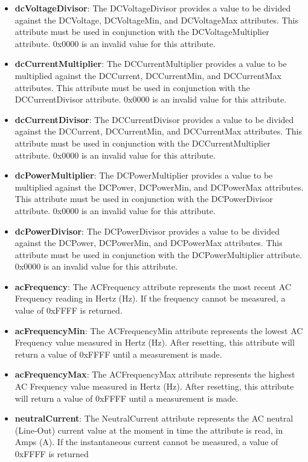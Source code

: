 \begin{itemize}
\item \textbf{dcVoltageDivisor}: The DCVoltageDivisor provides a value to be divided against the DCVoltage, DCVoltageMin, and DCVoltageMax attributes. This attribute must be used in conjunction with the DCVoltageMultiplier attribute. 0x0000 is an invalid value for this attribute.
\item \textbf{dcCurrentMultiplier}: The DCCurrentMultiplier provides a value to be multiplied against the DCCurrent, DCCurrentMin, and DCCurrentMax attributes. This attribute must be used in conjunction with the DCCurrentDivisor attribute. 0x0000 is an invalid value for this attribute.
\item \textbf{dcCurrentDivisor}: The DCCurrentDivisor provides a value to be divided against the DCCurrent, DCCurrentMin, and DCCurrentMax attributes. This attribute must be used in conjunction with the DCCurrentMultiplier attribute. 0x0000 is an invalid value for this attribute.
\item \textbf{dcPowerMultiplier}: The DCPowerMultiplier provides a value to be multiplied against the DCPower, DCPowerMin, and DCPowerMax attributes. This attribute must be used in conjunction with the DCPowerDivisor attribute. 0x0000 is an invalid value for this attribute.
\item \textbf{dcPowerDivisor}: The DCPowerDivisor provides a value to be divided against the DCPower, DCPowerMin, and DCPowerMax attributes. This attribute must be used in conjunction with the DCPowerMultiplier attribute. 0x0000 is an invalid value for this attribute.
\item \textbf{acFrequency}: The ACFrequency attribute represents the most recent AC Frequency reading in Hertz (Hz). If the frequency cannot be measured, a value of 0xFFFF is returned.
\item \textbf{acFrequencyMin}: The ACFrequencyMin attribute represents the lowest AC Frequency value measured in Hertz (Hz). After resetting, this attribute will return a value of 0xFFFF until a measurement is made.
\item \textbf{acFrequencyMax}: The ACFrequencyMax attribute represents the highest AC Frequency value measured in Hertz (Hz). After resetting, this attribute will return a value of 0xFFFF until a measurement is made.
\item \textbf{neutralCurrent}: The NeutralCurrent attribute represents the AC neutral (Line-Out) current value at the moment in time the attribute is read, in Amps (A). If the instantaneous current cannot be measured, a value of 0xFFFF is returned

\end{itemize}
